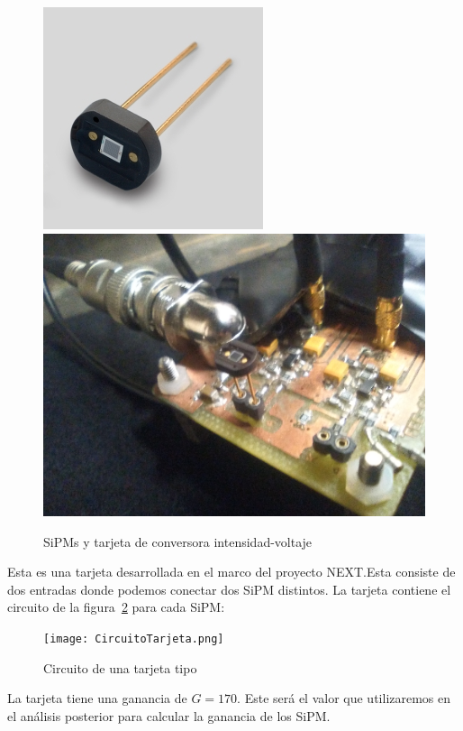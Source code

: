 \begin{enumerate}
\begin{figure}[htb]
\centering
{
\includegraphics[scale=0.55]{SiPM.png} 
}
{
\includegraphics[scale=0.23]{tarjeta.png} 
}
\caption{SiPMs y tarjeta de conversora intensidad-voltaje\label{TarjetaSiPM}}
\end{figure}
Esta es una tarjeta desarrollada en el marco del proyecto NEXT.Esta consiste de dos entradas donde podemos conectar dos SiPM distintos. La tarjeta contiene el circuito  de la figura~\ref{esquemacircuitotarjeta} para cada SiPM:

\begin{figure}[hbtp]
\centering
\texttt{[image: CircuitoTarjeta.png]}
\caption{Circuito de una tarjeta tipo~\cite{datasheet SiPM}\label{esquemacircuitotarjeta}}
\end{figure}
\newpage
La tarjeta tiene una ganancia de $G=170$. Este será el valor que utilizaremos en el análisis posterior para calcular la ganancia de los SiPM.


\end{enumerate}
